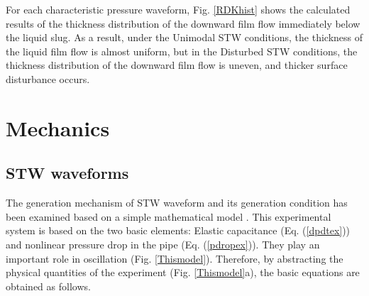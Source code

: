 \documentclass[aps,pre,preprint,groupedaddress,showkeys]{revtex4-2}
\begin{document}
For each characteristic pressure waveform, Fig. \ref{RDKhist} shows the calculated results of the thickness distribution of the downward film flow immediately below the liquid slug.
As a result, under the Unimodal STW conditions, the thickness of the liquid film flow is almost uniform, but in the Disturbed STW conditions, the thickness distribution of the downward film flow is uneven, and thicker surface disturbance occurs.



\section{Mechanics}\label{mec}
\subsection{STW waveforms}
The generation mechanism of STW waveform and its generation condition has been examined based on a simple mathematical model \citep{kanno2018}.
This experimental system is based on the two basic elements: Elastic capacitance (Eq. (\ref{dpdtex})) and nonlinear pressure drop in the pipe (Eq. (\ref{pdropex})). 
They play an important role in oscillation (Fig. \ref{Thismodel}).
Therefore, by abstracting the physical quantities of the experiment (Fig. \ref{Thismodel}a), the basic equations are obtained as follows.
 
\end{document}
